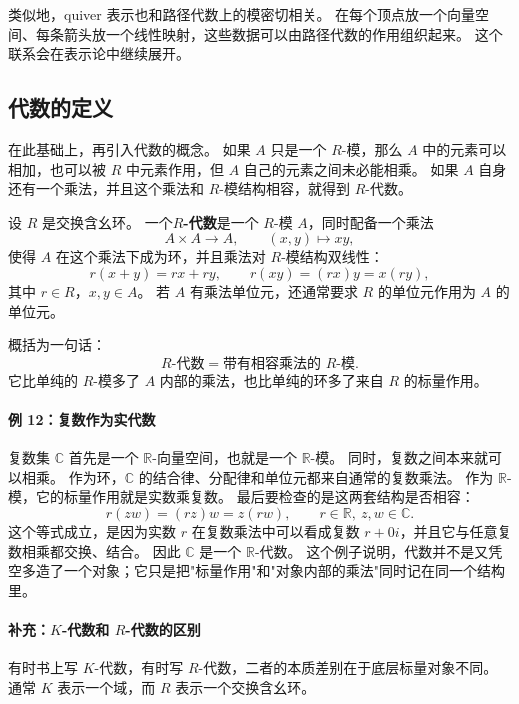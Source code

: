 类似地，quiver 表示也和路径代数上的模密切相关。
在每个顶点放一个向量空间、每条箭头放一个线性映射，这些数据可以由路径代数的作用组织起来。
这个联系会在表示论中继续展开。

\subsection{代数的定义}\label{sec:algebra-definition}

在此基础上，再引入代数的概念。
如果 $A$ 只是一个 $R$-模，那么 $A$ 中的元素可以相加，也可以被 $R$ 中元素作用，但 $A$ 自己的元素之间未必能相乘。
如果 $A$ 自身还有一个乘法，并且这个乘法和 $R$-模结构相容，就得到 $R$-代数。

\begin{definition}[$R$-代数]\label{def:algebra}
设 $R$ 是交换含幺环。
一个\textbf{$R$-代数}是一个 $R$-模 $A$，同时配备一个乘法
\[
A\times A\to A,\qquad (x,y)\mapsto xy,
\]
使得 $A$ 在这个乘法下成为环，并且乘法对 $R$-模结构双线性：
\[
r(x+y)=rx+ry,\qquad r(xy)=(rx)y=x(ry),
\]
其中 $r\in R$，$x,y\in A$。
若 $A$ 有乘法单位元，还通常要求 $R$ 的单位元作用为 $A$ 的单位元。
\end{definition}

概括为一句话：
\[
\text{$R$-代数}=\text{带有相容乘法的 $R$-模}.
\]
它比单纯的 $R$-模多了 $A$ 内部的乘法，也比单纯的环多了来自 $R$ 的标量作用。

\paragraph*{例 12：复数作为实代数}
复数集 $\mathbb C$ 首先是一个 $\mathbb R$-向量空间，也就是一个 $\mathbb R$-模。
同时，复数之间本来就可以相乘。
作为环，$\mathbb C$ 的结合律、分配律和单位元都来自通常的复数乘法。
作为 $\mathbb R$-模，它的标量作用就是实数乘复数。
最后要检查的是这两套结构是否相容：
\[
r(zw)=(rz)w=z(rw),\qquad r\in\mathbb R,\ z,w\in\mathbb C.
\]
这个等式成立，是因为实数 $r$ 在复数乘法中可以看成复数 $r+0i$，并且它与任意复数相乘都交换、结合。
因此 $\mathbb C$ 是一个 $\mathbb R$-代数。
这个例子说明，代数并不是又凭空多造了一个对象；它只是把"标量作用"和"对象内部的乘法"同时记在同一个结构里。

\paragraph*{补充：$K$-代数和 $R$-代数的区别}

有时书上写 $K$-代数，有时写 $R$-代数，二者的本质差别在于底层标量对象不同。
通常 $K$ 表示一个域，而 $R$ 表示一个交换含幺环。

